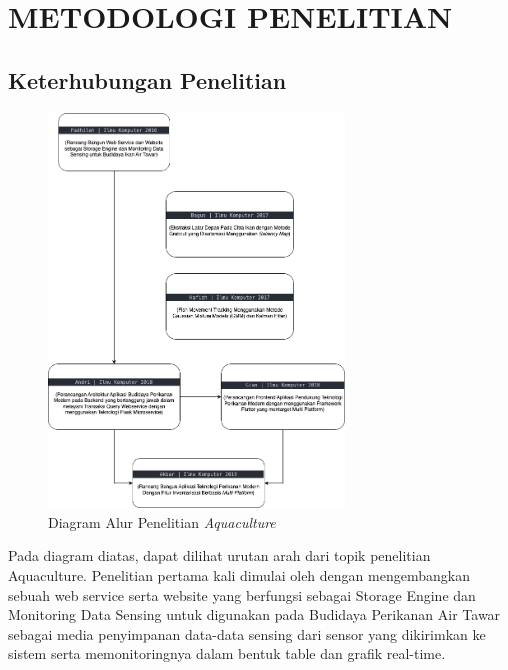 
\chapter{METODOLOGI PENELITIAN}

\section{Keterhubungan Penelitian}

\begin{figure}[H]
	\centering
	\includegraphics[width=0.7\textwidth]{gambar/akbar/research_tree.png}
	\caption{Diagram Alur Penelitian \textit{Aquaculture}}
\end{figure}

Pada diagram diatas, dapat dilihat urutan arah dari topik penelitian Aquaculture. Penelitian pertama kali dimulai oleh \citep{fadhil2022} dengan mengembangkan sebuah web service serta website yang berfungsi sebagai Storage Engine dan Monitoring Data Sensing untuk digunakan pada Budidaya Perikanan Air Tawar sebagai media penyimpanan data-data sensing dari sensor yang dikirimkan ke sistem serta memonitoringnya dalam bentuk table dan grafik real-time. 

